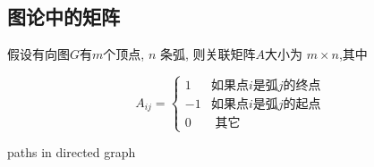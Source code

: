 \subsection{图论中的矩阵}


\begin{definition}[关联矩阵]
   假设有向图$G$有$m$个顶点,  $ n $ 条弧, 则关联矩阵$A$大小为 $ m \times n $,其中 

   $$ A_{i j}=\left\{\begin{array}{ll}1 & \text{如果点} i \text{是弧} j \text{的终点 } \\ -1 & \text {如果点}i \text{是弧}j \text{的起点} \\ 0 & \text { 其它 }\end{array}\right. $$
\end{definition}

\begin{example}[路径矩阵]
\begin{FigureCenter}{paths in directed graph}

\begin{tikzpicture}[x=0.75pt,y=0.75pt,yscale=-1,xscale=1]


\end{tikzpicture}
\end{FigureCenter}
\end{example}
